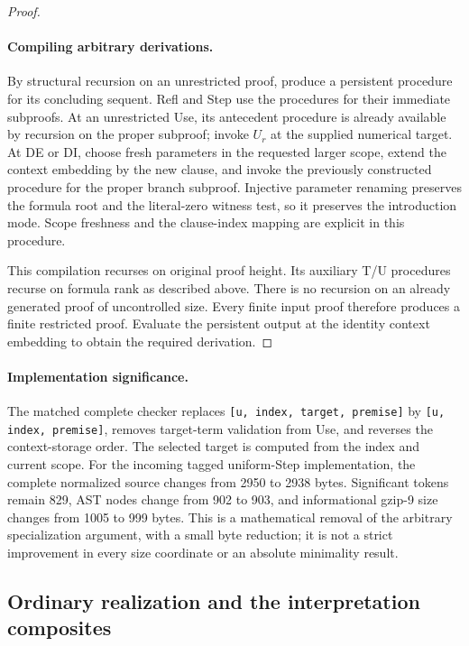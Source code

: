 \begin{proof}
\paragraph{Compiling arbitrary derivations.}
By structural recursion on an unrestricted proof, produce a persistent
procedure for its concluding sequent.  Refl and Step use the procedures
for their immediate subproofs.  At an unrestricted Use, its antecedent
procedure is already available by recursion on the proper subproof;
invoke \(U_r\) at the supplied numerical target.  At DE or DI, choose
fresh parameters in the requested larger scope, extend the context
embedding by the new clause, and invoke the previously constructed
procedure for the proper branch subproof.  Injective parameter renaming
preserves the formula root and the literal-zero witness test, so it
preserves the introduction mode.  Scope freshness and the clause-index
mapping are explicit in this procedure.

This compilation recurses on original proof height.  Its auxiliary T/U
procedures recurse on formula rank as described above.  There is no
recursion on an already generated proof of uncontrolled size.  Every
finite input proof therefore produces a finite restricted proof.
Evaluate the persistent output at the identity context embedding to
obtain the required derivation.
\end{proof}

\paragraph{Implementation significance.}
The matched complete checker replaces
\texttt{[u, index, target, premise]} by \texttt{[u, index, premise]}, removes
target-term validation from Use, and reverses the context-storage order.
The selected target is computed from the index and current scope.
For the incoming tagged uniform-Step implementation, the complete
normalized source changes from 2950 to 2938 bytes.  Significant tokens
remain 829, AST nodes change from 902 to 903, and informational gzip-9
size changes from 1005 to 999 bytes.  This is a mathematical removal of
the arbitrary specialization argument, with a small byte reduction;
it is not a strict improvement in every size coordinate or an absolute
minimality result.

\subsection{Ordinary realization and the interpretation composites}

